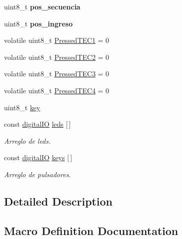 \begin{DoxyCompactItemize}
\item 
uint8\+\_\+t {\bfseries pos\+\_\+secuencia}\hypertarget{group__operaciones_gaec6603f5f72aab1b5ab7a2c0f519b616}{}\label{group__operaciones_gaec6603f5f72aab1b5ab7a2c0f519b616}

\item 
uint8\+\_\+t {\bfseries pos\+\_\+ingreso}\hypertarget{group__operaciones_gaebd8b3ca8f588bc6c172ef276a12bc53}{}\label{group__operaciones_gaebd8b3ca8f588bc6c172ef276a12bc53}

\item 
volatile uint8\+\_\+t \hyperlink{group__operaciones_gadada3867f506ba726c6c12a71b397621}{Pressed\+T\+E\+C1} = 0
\item 
volatile uint8\+\_\+t \hyperlink{group__operaciones_gaadec03bea3938c2760f06ffd88e33b94}{Pressed\+T\+E\+C2} = 0
\item 
volatile uint8\+\_\+t \hyperlink{group__operaciones_ga56c006b4c8f511fc9949e3c7a8a0eb84}{Pressed\+T\+E\+C3} = 0
\item 
volatile uint8\+\_\+t \hyperlink{group__operaciones_ga6436d6c08f548b81935197984bbcd720}{Pressed\+T\+E\+C4} = 0
\item 
uint8\+\_\+t \hyperlink{group__operaciones_ga3496dfc7a27df7eead65d48ed89e6867}{key}
\item 
const \hyperlink{structdigital_i_o}{digital\+IO} \hyperlink{group__operaciones_ga9b625a8f4af05b1e2bdb0230a6440c77}{leds} \mbox{[}$\,$\mbox{]}
\begin{DoxyCompactList}\small\item\em Arreglo de leds. \end{DoxyCompactList}\item 
const \hyperlink{structdigital_i_o}{digital\+IO} \hyperlink{group__operaciones_ga827b5290b185d584f07107e0190dd6d2}{keys} \mbox{[}$\,$\mbox{]}
\begin{DoxyCompactList}\small\item\em Arreglo de pulsadores. \end{DoxyCompactList}\end{DoxyCompactItemize}


\subsection{Detailed Description}


\subsection{Macro Definition Documentation}
